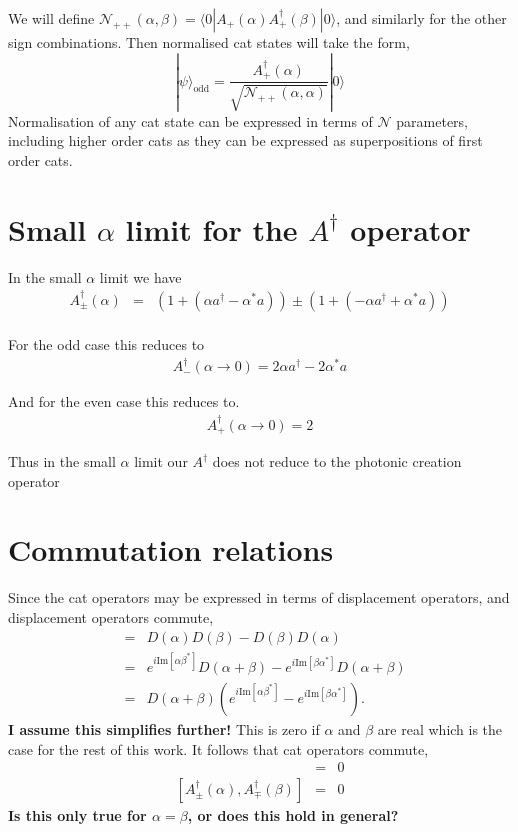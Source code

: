 \documentclass[aps,prl,twocolumn,amsmath,amssymb,nofootinbib,superscriptaddress]{revtex4}
\newcommand{\bra}[1]{\langle#1|}
\newcommand{\ket}[1]{|#1\rangle}
\begin{document}
We will define $\mathcal{N_{++}(\alpha,\beta)} = \bra{0}A_+(\alpha)A^\dag_+(\beta)\ket{0}$, and similarly for the other sign combinations. Then normalised cat states will take the form,
\begin{equation}
\ket\psi_\mathrm{odd} = \frac{A_+^\dag(\alpha)}{\sqrt{\mathcal{N}_{++}(\alpha,\alpha)}}\ket{0}
\end{equation}
Normalisation of any cat state can be expressed in terms of $\mathcal{N}$ parameters, including higher order cats as they can be expressed as superpositions of first order cats.

\section{Small $\alpha$ limit for the $A^\dag$ operator}

In the small $\alpha$ limit we have
\begin{eqnarray}
A^\dag_\pm(\alpha)  &=& (1+(\alpha a^\dag - \alpha^* a)) \pm (1+(-\alpha a^\dag + \alpha^* a)) \nonumber \\
\end{eqnarray}

For the odd case this reduces to
\begin{eqnarray}
A^\dag_-(\alpha\to 0) = 2\alpha a^\dag - 2\alpha^* a
\end{eqnarray}

And for the even case this reduces to.
\begin{eqnarray}
A^\dag_+(\alpha\to 0) = 2
\end{eqnarray}

Thus in the small $\alpha$ limit our $A^\dag$ does not reduce to the photonic creation operator

\section{Commutation relations}

Since the cat operators may be expressed in terms of displacement operators, and displacement operators commute, 
\begin{eqnarray}
[D(\alpha),D(\beta)] &=& D(\alpha)D(\beta)-D(\beta)D(\alpha) \nonumber \\
&=& e^{i \mathrm{Im}[\alpha \beta^*]}D(\alpha+\beta)-e^{i \mathrm{Im}[\beta \alpha^*]}D(\alpha+\beta) \nonumber \\
&=& D(\alpha+\beta)\left(e^{i \mathrm{Im}[\alpha \beta^*]}- e^{i \mathrm{Im}[\beta \alpha^*]}\right).
\end{eqnarray}
\textbf{I assume this simplifies further!}
This is zero if $\alpha$ and $\beta$ are real which is the case for the rest of this work. It follows that cat operators commute,
\begin{eqnarray}
[A_\pm^\dag(\alpha), A_\pm^\dag(\beta)] &=& 0 \\ \nonumber
[A_\pm^\dag(\alpha), A_\mp^\dag(\beta)] &=& 0 
\end{eqnarray}
\textbf{Is this only true for $\alpha=\beta$, or does this hold in general?}
\end{document}
